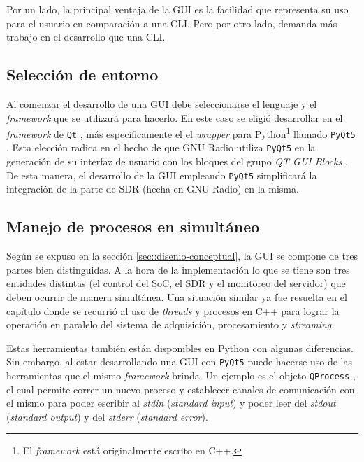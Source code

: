 \documentclass[../../main.tex]{subfiles}
\begin{document}
Por un lado, la principal ventaja de la GUI es la facilidad que representa su uso para el usuario en comparación a una CLI. Pero por otro lado, demanda más trabajo en el desarrollo que una CLI.

\subsection{Selección de entorno}
Al comenzar el desarrollo de una GUI debe seleccionarse el lenguaje y el \textit{framework} que se utilizará para hacerlo. En este caso se eligió desarrollar en el \textit{framework} de \texttt{Qt} \cite{Qt-framework}, más específicamente el el \textit{wrapper} para Python\footnote{El \textit{framework} está originalmente escrito en C++.} llamado \texttt{PyQt5} \cite{pyqt5}. Esta elección radica en el hecho de que GNU Radio utiliza \texttt{PyQt5} en la generación de su interfaz de usuario con los bloques del grupo \textit{QT GUI Blocks} \cite{gnuradio-qt}. De esta manera, el desarrollo de la GUI empleando \texttt{PyQt5} simplificará la integración de la parte de SDR (hecha en GNU Radio) en la misma.

\subsection{Manejo de procesos en simultáneo}
Según se expuso en la sección \ref{sec::disenio-conceptual}, la GUI se compone de tres partes bien distinguidas. A la hora de la implementación lo que se tiene son tres entidades distintas (el control del SoC, el SDR y el monitoreo del servidor) que deben ocurrir de manera simultánea. Una situación similar ya fue resuelta en el capítulo  donde se recurrió al uso de \textit{threads} y procesos en C++ para lograr la operación en paralelo del sistema de adquisición, procesamiento y \textit{streaming}. 

Estas herramientas también están disponibles en Python con algunas diferencias. Sin embargo, al estar desarrollando una GUI con \texttt{PyQt5} puede hacerse uso de las herramientas que el mismo \textit{framework} brinda. Un ejemplo es el objeto \texttt{QProcess} \cite{qprocess}, el cual permite correr un nuevo proceso y establecer canales de comunicación con el mismo para poder escribir al \textit{stdin} (\textit{standard input}) y poder leer del \textit{stdout} (\textit{standard output}) y del \textit{stderr} (\textit{standard error}).
\end{document}
